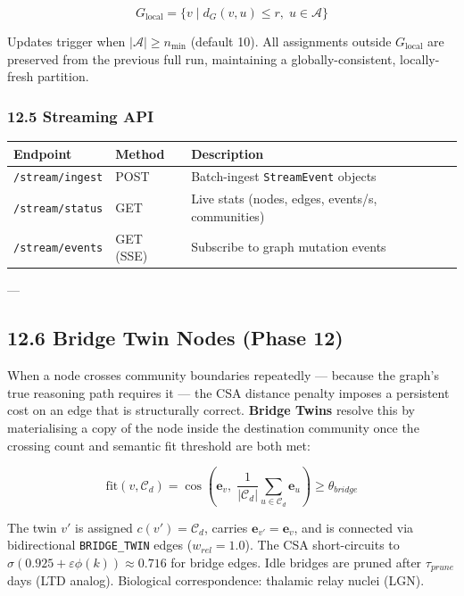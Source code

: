 \documentclass[10pt,journal,compsoc]{IEEEtran}
\begin{document}
\begin{equation}
G_{\text{local}} = \{v \mid d_G(v, u) \leq r,\; u \in \mathcal{A}\}
\end{equation}

Updates trigger when $|\mathcal{A}| \geq n_{\min}$ (default 10). All
assignments outside $G_{\text{local}}$ are preserved from the previous full
run, maintaining a globally-consistent, locally-fresh partition.

\subsubsection{12.5 Streaming API}

\begin{center}
{\footnotesize
\begin{tabularx}{\columnwidth}{|>{\raggedright\arraybackslash}X|>{\raggedright\arraybackslash}X|>{\raggedright\arraybackslash}X|}
\hline
Endpoint & Method & Description \\ \hline
\texttt{/stream/ingest} & POST & Batch-ingest \texttt{StreamEvent} objects \\ \hline
\texttt{/stream/status} & GET & Live stats (nodes, edges, events/s, communities) \\ \hline
\texttt{/stream/events} & GET (SSE) & Subscribe to graph mutation events \\ \hline
\end{tabularx}
}
\end{center}

---

\subsection{12.6 Bridge Twin Nodes (Phase 12)}

When a node crosses community boundaries repeatedly — because the graph's true reasoning path requires it — the CSA distance penalty imposes a persistent cost on an edge that is struc\-turally correct. \textbf{Bridge Twins} resolve this by mater\-ialising a copy of the node inside the destination community once the crossing count and semantic fit threshold are both met:

\begin{equation}
\text{fit}(v, \mathcal{C}_d) = \cos\!\left(\mathbf{e}_v,\; \frac{1}{|\mathcal{C}_d|}\sum_{u \in \mathcal{C}_d} \mathbf{e}_u\right) \geq \theta_{bridge}
\end{equation}

The twin $v'$ is assigned $c(v') = \mathcal{C}_d$, carries $\mathbf{e}_{v'} = \mathbf{e}_v$, and is connected via bidir\-ectional \texttt{BRIDGE\_TWIN} edges ($w_{rel} = 1.0$). The CSA short-circuits to $\sigma(0.925 + \varepsilon\phi(k)) \approx 0.716$ for bridge edges. Idle bridges are pruned after $\tau_{prune}$ days (LTD analog). Biological corre\-spondence: thalamic relay nuclei (LGN).
\end{document}
